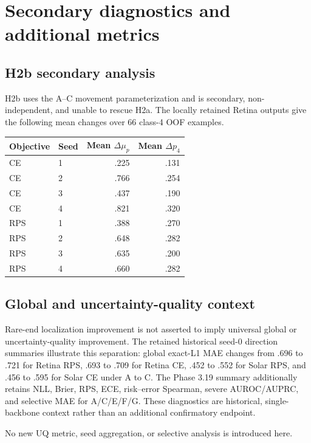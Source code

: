 \section{Secondary diagnostics and additional metrics}

\subsection{H2b secondary analysis}

H2b uses the A--C movement parameterization and is secondary, non-independent,
and unable to rescue H2a. The locally retained Retina outputs give the following
mean changes over 66 class-4 OOF examples.

\begin{center}
\begin{tabular}{llrr}
\toprule
Objective & Seed & Mean $\Delta\mu_p$ & Mean $\Delta p_4$ \\
\midrule
CE & 1 & .225 & .131 \\
CE & 2 & .766 & .254 \\
CE & 3 & .437 & .190 \\
CE & 4 & .821 & .320 \\
RPS & 1 & .388 & .270 \\
RPS & 2 & .648 & .282 \\
RPS & 3 & .635 & .200 \\
RPS & 4 & .660 & .282 \\
\bottomrule
\end{tabular}
\end{center}

\subsection{Global and uncertainty-quality context}

Rare-end localization improvement is not asserted to imply universal global or
uncertainty-quality improvement. The retained historical seed-0 direction
summaries illustrate this separation: global exact-L1 MAE changes from .696 to
.721 for Retina RPS, .693 to .709 for Retina CE, .452 to .552 for Solar RPS,
and .456 to .595 for Solar CE under A to C. The Phase 3.19 summary additionally
retains NLL, Brier, RPS, ECE, risk--error Spearman, severe AUROC/AUPRC, and
selective MAE for A/C/E/F/G. These diagnostics are historical, single-backbone
context rather than an additional confirmatory endpoint.

No new UQ metric, seed aggregation, or selective analysis is introduced here.


